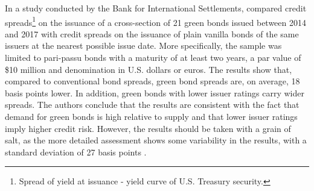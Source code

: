 In a study conducted by the Bank for International Settlements, \citet{ehlers2017green} compared credit spreads\footnote{Spread of yield at issuance - yield curve of U.S. Treasury security.} on the issuance of a cross-section of 21 green bonds issued between 2014 and 2017 with credit spreads on the issuance of plain vanilla bonds of the same issuers at the nearest possible issue date. More specifically, the sample was limited to pari-passu bonds with a maturity of at least two years, a par value of \$10 million and denomination in U.S. dollars or euros. The results show that, compared to conventional bond spreads, green bond spreads are, on average, 18 basis points lower. In addition, green bonds with lower issuer ratings carry wider spreads. The authors conclude that the results are consistent with the fact that demand for green bonds is high relative to supply and that lower issuer ratings imply higher credit risk. However, the results should be taken with a grain of salt, as the more detailed assessment shows some variability in the results, with a standard deviation of 27 basis points \citep[pp. 97--98]{ehlers2017green}.

